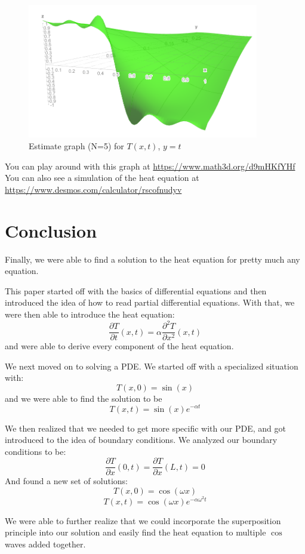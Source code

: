\documentclass{report}
\newcommand{\heatequation}[0]{\frac{\partial T}{\partial t}(x,t) = \alpha \frac{\partial^2 T}{\partial x^2}(x,t)}
\begin{document}
\begin{figure}[H]
    \centering
    \includegraphics[width=0.9\textwidth]{images/two_rods_heat_equation_soln.png}
    \caption{Estimate graph (N=5) for $T(x,t)$, \quad  $y = t$}
\end{figure}

You can play around with this graph at \url{https://www.math3d.org/d9mHKfYHf}
You can also see a simulation of the heat equation at \url{https://www.desmos.com/calculator/rscofnudyv}

\chapter{Conclusion}
Finally, we were able to find a solution to the heat equation for pretty much any equation. 

This paper started off with the basics of differential equations and then introduced the idea of how to read partial differential equations. With that, we were then able to introduce the heat equation:
\[ \heatequation \]
and were able to derive every component of the heat equation.

We next moved on to solving a PDE. We started off with a specialized situation with:
\[ T(x,0) = \sin(x) \]
and we were able to find the solution to be
\[ T(x,t) = \sin(x)e^{-\alpha t}  \]

We then realized that we needed to get more specific with our PDE, and got introduced to the idea of boundary conditions.
We analyzed our boundary conditions to be: 
\[ \frac{\partial T}{\partial x}(0,t) = \frac{\partial T}{\partial x}(L,t) = 0 \]
And found a new set of solutions:
\[T(x,0) = \cos(\omega x) \]
\[ T(x,t) = \cos(\omega x)e^{-\alpha\omega^2t}  \]

We were able to further realize that we could incorporate the superposition principle into our solution and easily find the heat equation to multiple $\cos$ waves added together.
\end{document}
